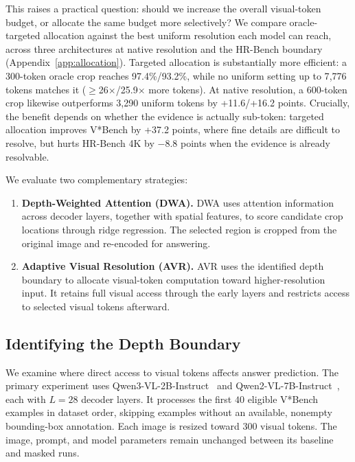 \documentclass{article} %
\begin{document}
This raises a practical question: should we increase the overall visual-token budget, or allocate the same budget more selectively? We compare oracle-targeted allocation against the best uniform resolution each model can reach, across three architectures at native resolution and the HR-Bench boundary (Appendix~\ref{app:allocation}). Targeted allocation is substantially more efficient: a 300-token oracle crop reaches 97.4\%/93.2\%, while no uniform setting up to 7{,}776 tokens matches it ($\geq$26$\times$/25.9$\times$ more tokens). At native resolution, a 600-token crop likewise outperforms 3,290 uniform tokens by +11.6/+16.2 points. Crucially, the benefit depends on whether the evidence is actually sub-token: targeted allocation improves V*Bench by +37.2 points, where fine details are difficult to resolve, but hurts HR-Bench 4K by $-8.8$ points when the evidence is already resolvable.

We evaluate two complementary strategies:
\begin{enumerate}
    \item \textbf{Depth-Weighted Attention (DWA).}
    DWA uses attention information across decoder layers, together with
    spatial features, to score candidate crop locations through ridge
    regression. The selected region is cropped from the original image
    and re-encoded for answering.

    \item \textbf{Adaptive Visual Resolution (AVR).}
    AVR uses the identified depth boundary to allocate visual-token
    computation toward higher-resolution input. It retains full visual
    access through the early layers and restricts access to selected
    visual tokens afterward.
\end{enumerate}

\subsection{Identifying the Depth Boundary}
\label{sec:depth_boundary}

We examine where direct access to visual tokens affects answer
prediction. The primary experiment uses Qwen3-VL-2B-Instruct~\citep{qwen3vl}
and Qwen2-VL-7B-Instruct~\citep{wang2024qwen2vl}, each with \(L=28\) decoder layers. It processes
the first \(40\) eligible V*Bench examples in dataset order, skipping
examples without an available, nonempty bounding-box annotation.
Each image is resized toward \(300\) visual tokens. The image, prompt,
and model parameters remain unchanged between its baseline and masked
runs.
\end{document}
